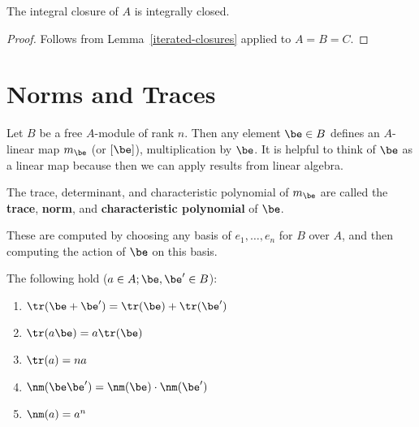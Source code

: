 \begin{pr}
The integral closure of $A$ is integrally closed.
\end{pr}
\begin{proof}
Follows from Lemma~\ref{iterated-closures} applied to $A=B=C$.\qedhere
\end{proof}

\section{Norms and Traces}
Let $B$ be a free $A$-module of rank $n$. Then any element $\be\in B$ defines an $A$-linear map $m_{\be}$ (or $[\be]$), multiplication by $\be$. It is helpful to think of $\be$ as a linear map because then we can apply results from linear algebra.
\begin{df}
The trace, determinant, and characteristic polynomial of $m_{\be}$ are called the {\textbf{trace}}, {\textbf{norm}}, and {\textbf{characteristic polynomial}} of $\be$.
\end{df}
These are computed by choosing any basis of $e_1,\ldots, e_n$ for $B$ over $A$, and then computing the action of $\be$ on this basis.
\begin{pr}
The following hold ($a\in A; \be,\be'\in B$):
\begin{enumerate}
\item $\tr(\be+\be')=\tr(\be)+\tr(\be')$
\item $\tr(a\be)=a\tr(\be)$
\item $\tr(a)=na$
\item $\nm(\be\be')=\nm(\be)\cdot \nm (\be')$
\item $\nm(a)=a^n$
\end{enumerate}
\end{pr}

